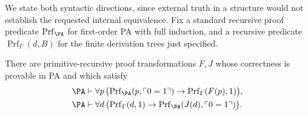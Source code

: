 We state both syntactic directions, since external truth in a structure
would not establish the requested internal equivalence.  Fix a standard
recursive proof predicate $\operatorname{Prf}_{\PA}$ for first-order PA
with full induction, and a recursive predicate
$\operatorname{Prf}_\Gamma(d,B)$ for the finite derivation trees just
specified.

\begin{lemma}
\label{cal:logical-lemma}
There are primitive-recursive proof transformations $F,J$ whose
correctness is provable in PA and which satisfy
\begin{align*}
 \PA&\vdash\forall p\,
  \bigl(\operatorname{Prf}_{\PA}(p,\ulcorner0=1\urcorner)
       \to\operatorname{Prf}_\Gamma(F(p),1)\bigr),\\
 \PA&\vdash\forall d\,
  \bigl(\operatorname{Prf}_\Gamma(d,1)
       \to\operatorname{Prf}_{\PA}(J(d),\ulcorner0=1\urcorner)\bigr).
\end{align*}
\end{lemma}

